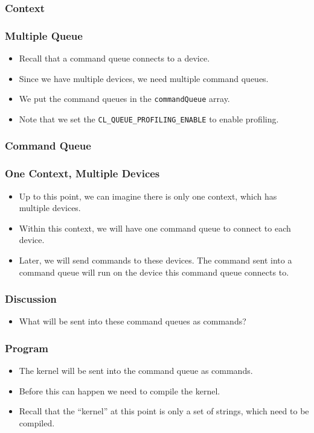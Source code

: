 \documentclass{beamer}
\begin{document}
\begin{frame}
  \frametitle{Context}
\end{frame}

\begin{frame}
  \frametitle{Multiple Queue}
  \begin{itemize}
    \item Recall that a command queue connects to a device.  
    \item Since we have multiple devices, we need multiple
      command queues.
    \item We put the command queues in the {\tt commandQueue} array.
    \item Note that we set the {\tt CL\_QUEUE\_PROFILING\_ENABLE} to
      enable profiling.
  \end{itemize}
\end{frame}

\begin{frame}
  \frametitle{Command Queue}
\end{frame}

\begin{frame}
  \frametitle{One Context, Multiple Devices}
  \begin{itemize}
    \item Up to this point, we can imagine there is only one context,
      which has multiple devices.
    \item Within this context, we will have one command queue to connect
      to each device.
    \item Later, we will send commands to these devices.  The command
      sent into a command queue will run on the device this command
      queue connects to.
  \end{itemize}
\end{frame}

\begin{frame}
  \frametitle{Discussion}
  \begin{itemize}
    \item What will be sent into these command queues as commands?
  \end{itemize}
\end{frame}

\begin{frame}
  \frametitle{Program}
  \begin{itemize}
    \item The kernel will be sent into the command queue as commands.
    \item Before this can happen we need to compile the kernel.
    \item Recall that the ``kernel'' at this point is only a set
      of strings, which need to be compiled.
  \end{itemize}
\end{frame}
\end{document}
